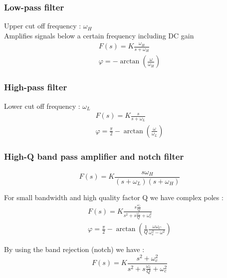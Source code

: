 \documentclass[../main.tex]{subfiles}
\begin{document}
\subsubsection{Low-pass filter}
Upper cut off frequency : $\omega_H$\\
Amplifies signals below a certain frequency including DC gain\\
\begin{equation}
    \begin{gathered}
        F(s) = K \frac{\omega_H}{s+\omega_H}\\
        \varphi = -\arctan(\frac{\omega}{\omega_H})
    \end{gathered}
\end{equation}

\subsubsection{High-pass filter}
Lower cut off frequency : $\omega_L$\\
\begin{equation}
    \begin{gathered}
        F(s) = K \frac{s}{s+\omega_L}\\
        \varphi = \frac{\pi}{2} - \arctan(\frac{\omega}{\omega_L})
    \end{gathered}
\end{equation}

\subsubsection{High-Q band pass amplifier and notch filter}
\begin{equation}
    F(s) = K \frac{s \omega_H}{(s+\omega_L)(s+\omega_H)}
\end{equation}

For small bandwidth and high quality factor Q we have complex poles : \\
\begin{equation}
    \begin{gathered}
        F(s) = K \frac{s \frac{\omega_c}{Q}}{s^2 + s \frac{\omega_c}{Q} + \omega_c^2}\\
        \varphi = \frac{\pi}{2}-\arctan(\frac{1}{Q} \frac{\omega \omega_C}{\omega_c^2-\omega^2})
    \end{gathered}
\end{equation}

By using the band rejection (notch) we have : \\
\begin{equation}
    F(s) = K \frac{s^2 + \omega_c^2}{s^2+s \frac{\omega_c}{Q} + \omega_c^2}
\end{equation}
\end{document}
